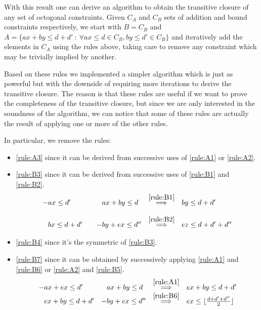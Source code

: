 With this result one can derive an algorithm to obtain the transitive closure of any
set of octogonal constraints. Given $C_A$ and $C_B$ sets of addition and bound 
constraints respectively, we start with $B = C_B$ and 
$A = \{ax + by \le d + d'\ :\  \forall ax\le d\in C_B, by\le d'\in C_B\}$ and 
iteratively add the elements in $C_A$ using the rules above, taking care to remove
any constraint which may be trivially implied by another.

Based on these rules we implemented a simpler algorithm which is just as powerful but
with the downside of requiring more iterations to derive the transitive closure.
The reason is that these rules are useful if we want to prove the completeness of the 
transitive closure, but since we are only interested in the soundness of the algorithm,
we can notice that some of these rules are actually the result of applying one or more
of the other rules.

In particular, we remove the rules:
\begin{itemize}
    \item  \ref{rule:A3} since it can be derived from successive uses of \ref{rule:A1}
           or \ref{rule:A2}.
    \item  \ref{rule:B3} since it can be derived from successive uses of \ref{rule:B1}
           and \ref{rule:B2}.
           $$
           \begin{array}{llll}
           -ax \le d'&\quad \phantom{-}ax + by \le d &\overset{\ref{rule:B1}}{\Longrightarrow} &by \le d + d' \\
           \\
           \phantom{-}bx \le d + d'&\quad -by + ex \le d'' &\overset{\ref{rule:B2}}{\Longrightarrow} &ez \le d + d' + d'' \\
           \end{array}
           $$
    \item  \ref{rule:B4} since it's the symmetric of \ref{rule:B3}.
    \item  \ref{rule:B7} since it can be obtained by successively applying \ref{rule:A1} and
           \ref{rule:B6} or \ref{rule:A2} and \ref{rule:B5}.
           $$
           \begin{array}{llll}
           -ax + ex \le d' & \phantom{-}ax + by \le d &\overset{\ref{rule:A1}}{\Longrightarrow} &
             ex + by \le d + d' \\
           \phantom{-}ex + by \le d + d' & -by + ex \le d'' &\overset{\ref{rule:B6}}{\Longrightarrow} &
             ex \le \lfloor\frac{d + d' + d''}{2}\rfloor \\
           \end{array}
           $$
\end{itemize}

